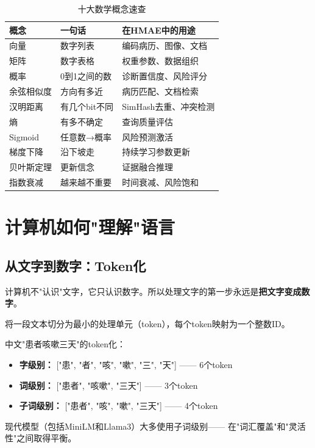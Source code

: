 \documentclass[11pt,a4paper]{ctexart}
\begin{document}
\begin{table}[H]
\centering
\small
\begin{tabular}{lll}
\toprule
\textbf{概念} & \textbf{一句话} & \textbf{在HMAE中的用途} \\
\midrule
向量 & 数字列表 & 编码病历、图像、文档 \\
矩阵 & 数字表格 & 权重参数、数据组织 \\
概率 & 0到1之间的数 & 诊断置信度、风险评分 \\
余弦相似度 & 方向有多近 & 病历匹配、文档检索 \\
汉明距离 & 有几个bit不同 & SimHash去重、冲突检测 \\
熵 & 有多不确定 & 查询质量评估 \\
Sigmoid & 任意数→概率 & 风险预测激活 \\
梯度下降 & 沿下坡走 & 持续学习参数更新 \\
贝叶斯定理 & 更新信念 & 证据融合推理 \\
指数衰减 & 越来越不重要 & 时间衰减、风险饱和 \\
\bottomrule
\end{tabular}
\caption{十大数学概念速查}
\end{table}

\newpage

\section{计算机如何"理解"语言}

\subsection{从文字到数字：Token化}

计算机不"认识"文字，它只认识数字。所以处理文字的第一步永远是\textbf{把文字变成数字}。

\begin{defbox}
将一段文本切分为最小的处理单元（token），每个token映射为一个整数ID。
\end{defbox}

\begin{exambox}[Token化的三种粒度]
中文"患者咳嗽三天"的token化：
\begin{itemize}[nosep]
\item \textbf{字级别：} ["患", "者", "咳", "嗽", "三", "天"] —— 6个token
\item \textbf{词级别：} ["患者", "咳嗽", "三天"] —— 3个token
\item \textbf{子词级别：} ["患者", "咳", "嗽", "三天"] —— 4个token
\end{itemize}
现代模型（包括MiniLM和Llama3）大多使用子词级别——
在"词汇覆盖"和"灵活性"之间取得平衡。
\end{exambox}
\end{document}
